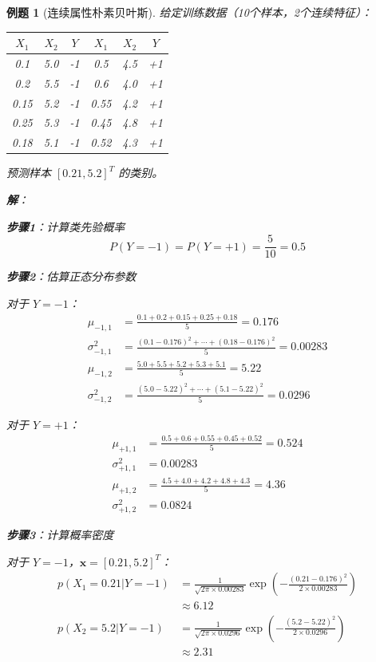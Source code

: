 \documentclass[12pt,a4paper]{ctexart}
\newtheorem{exercise}{例题}[section]
\begin{document}
\begin{exercise}[连续属性朴素贝叶斯]
给定训练数据（10个样本，2个连续特征）：

\begin{center}
\begin{tabular}{ccc|ccc}
\toprule
$X_1$ & $X_2$ & $Y$ & $X_1$ & $X_2$ & $Y$ \\
\midrule
0.1 & 5.0 & -1 & 0.5 & 4.5 & +1 \\
0.2 & 5.5 & -1 & 0.6 & 4.0 & +1 \\
0.15 & 5.2 & -1 & 0.55 & 4.2 & +1 \\
0.25 & 5.3 & -1 & 0.45 & 4.8 & +1 \\
0.18 & 5.1 & -1 & 0.52 & 4.3 & +1 \\
\bottomrule
\end{tabular}
\end{center}

预测样本 $[0.21, 5.2]^T$ 的类别。

\textbf{解}：

\textbf{步骤1}：计算类先验概率
\[
P(Y=-1) = P(Y=+1) = \frac{5}{10} = 0.5
\]

\textbf{步骤2}：估算正态分布参数

对于 $Y=-1$：
\begin{align*}
\mu_{-1,1} &= \frac{0.1+0.2+0.15+0.25+0.18}{5} = 0.176 \\
\sigma_{-1,1}^2 &= \frac{(0.1-0.176)^2 + \cdots + (0.18-0.176)^2}{5} = 0.00283 \\
\mu_{-1,2} &= \frac{5.0+5.5+5.2+5.3+5.1}{5} = 5.22 \\
\sigma_{-1,2}^2 &= \frac{(5.0-5.22)^2 + \cdots + (5.1-5.22)^2}{5} = 0.0296
\end{align*}

对于 $Y=+1$：
\begin{align*}
\mu_{+1,1} &= \frac{0.5+0.6+0.55+0.45+0.52}{5} = 0.524 \\
\sigma_{+1,1}^2 &= 0.00283 \\
\mu_{+1,2} &= \frac{4.5+4.0+4.2+4.8+4.3}{5} = 4.36 \\
\sigma_{+1,2}^2 &= 0.0824
\end{align*}

\textbf{步骤3}：计算概率密度

对于 $Y=-1$，$\mathbf{x} = [0.21, 5.2]^T$：
\begin{align*}
p(X_1=0.21 | Y=-1) &= \frac{1}{\sqrt{2\pi \times 0.00283}} \exp\left(-\frac{(0.21-0.176)^2}{2 \times 0.00283}\right) \\
&\approx 6.12 \\
p(X_2=5.2 | Y=-1) &= \frac{1}{\sqrt{2\pi \times 0.0296}} \exp\left(-\frac{(5.2-5.22)^2}{2 \times 0.0296}\right) \\
&\approx 2.31
\end{align*}


\end{exercise}
\end{document}
